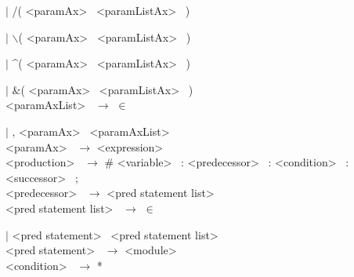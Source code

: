 \hspace{2cm} $|$ /(  \textless paramAx\textgreater~ \textless paramListAx\textgreater~ ) 

\hspace{2cm} $|$ $\backslash$(  \textless paramAx\textgreater~ \textless paramListAx\textgreater~ )

\hspace{2cm} $|$ \textasciicircum (  \textless paramAx\textgreater~ \textless paramListAx\textgreater~ ) 

\hspace{2cm} $|$ $\&$(  \textless paramAx\textgreater~ \textless paramListAx\textgreater~ ) \\



\noindent
\textless paramAxList\textgreater~ $\rightarrow$  $\in$ 

\hspace{2cm} $|$ , \textless paramAx\textgreater~ \textless paramAxList\textgreater~ \\



\noindent
\textless paramAx\textgreater~ $\rightarrow$ \textless expression\textgreater~ \\



\noindent
\textless production\textgreater~ $\rightarrow$  \# \textless variable\textgreater~  : \textless predecessor\textgreater~ : \textless condition\textgreater~  : \textless successor\textgreater~ ;\\



\noindent
\textless predecessor\textgreater~ $\rightarrow$ \textless pred statement list\textgreater~ \\


\noindent
\textless pred statement list\textgreater~ $\rightarrow$ $\in$

\hspace{2cm} $|$ \textless pred statement\textgreater~ \textless pred statement list\textgreater~ \\


\noindent
\textless pred statement\textgreater~ $\rightarrow$ \textless module\textgreater~ \\



\noindent
\textless condition\textgreater~ $\rightarrow$ *

